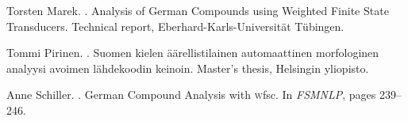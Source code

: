 \documentclass[a4paper]{article}
\begin{document}
\begin{thebibliography}{14}
Torsten Marek.
.
\newblock Analysis of German Compounds using Weighted Finite State Transducers.
\newblock Technical report, Eberhard-Karls-Universität Tübingen.

Tommi Pirinen.
.
\newblock Suomen kielen äärellistilainen automaattinen morfologinen
  analyysi avoimen lähdekoodin keinoin.
\newblock Master's thesis, Helsingin yliopisto.

Anne Schiller.
.
\newblock German Compound Analysis with {\textsc wfsc}.
\newblock In {\em FSMNLP}, pages 239--246.


\end{thebibliography}
\end{document}
